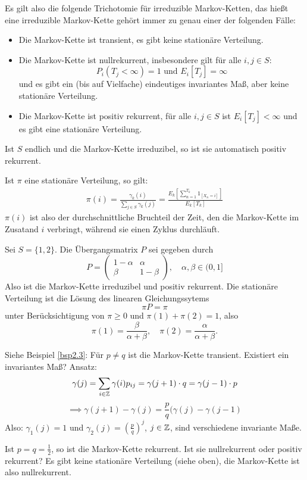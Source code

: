 \documentclass[a4paper,twoside,DIV15,BCOR12mm]{scrbook}
\begin{document}
\begin{bemerkung}
\begin{enumi}
\item Es gilt also die folgende Trichotomie für irreduzible Markov-Ketten, das hießt eine irreduzible Markov-Kette gehört immer zu genau einer der folgenden Fälle:
\begin{itemize}
\item Die Markov-Kette ist transient, es gibt keine stationäre Verteilung.
\item Die Markov-Kette ist nullrekurrent, insbesondere gilt für alle $i,j\in S$:
\[P_i(T_j<\infty) = 1\text{ und }E_i[T_j]=\infty\]
und es gibt ein (bis auf Vielfache) eindeutiges invariantes Maß, aber keine stationäre Verteilung.
\item Die Markov-Kette ist positiv rekurrent, für alle $i,j\in S$ ist $E_i[T_j]<\infty$ und es gibt eine stationäre Verteilung.
\end{itemize}

\item Ist $S$ endlich und die Markov-Kette irreduzibel, so ist sie automatisch positiv rekurrent.

\item Ist $\pi$ eine stationäre Verteilung, so gilt:
\begin{align*}
\pi(i) = \frac{\gamma_k(i)}{\sum_{j\in S} \gamma_k(j)}
= \frac{E_k[\sum_{n=1}^{T_k} 1_{[X_n=i]}]}{E_k[T_k]}
\end{align*}
$\pi(i)$ ist also der durchschnittliche Bruchteil der Zeit, den die Markov-Kette im Zusatand $i$ verbringt, während sie einen Zyklus durchläuft.
\end{enumi}
\end{bemerkung}

\begin{beispiel}
Sei $S=\{1,2\}$. Die Übergangsmatrix $P$ sei gegeben durch 
\[
P=
\begin{pmatrix}
1-\alpha & \alpha \\
\beta & 1-\beta
\end{pmatrix}, \quad \alpha,\beta \in (0,1]
\]
Also ist die Markov-Kette irreduzibel und positiv rekurrent. Die stationäre Verteilung ist die Lösung des linearen Gleichungssytems
\[ \pi P = \pi\]
unter Berücksichtigung von $\pi \ge 0$ und $\pi(1) + \pi(2) = 1$,
also
\[
\pi(1) = \frac\beta{\alpha + \beta}, \quad \pi(2)=\frac{\alpha}{\alpha+\beta}.
\]
\end{beispiel}

\begin{beispiel}[Irrfahrt]
Siehe Beispiel \ref{bsp2.3}: Für $p\ne q$ ist die Markov-Kette transient. Existiert ein invariantes Maß? Ansatz:
\[
\gamma(j) = \sum_{i\in \mathbb{Z}} \gamma (i) p_{ij} = \gamma(j+1)\cdot q = \gamma(j-1)\cdot p
\]
\[
\implies \gamma(j+1) - \gamma(j) = \frac pq (\gamma(j) - \gamma(j-1)
\]
Also: $\gamma_1(j) = 1$  und $\gamma_2(j) = (\frac pq)^{j}$, $j\in \mathbb{Z}$, sind verschiedene invariante Maße.

Ist $p=q=\frac 12$, so ist die Markov-Kette rekurrent. Ist sie nullrekurrent oder positiv rekurrent? Es gibt keine stationäre Verteilung (siehe oben), die Markov-Kette ist also nullrekurrent.
\end{beispiel}
\end{document}
